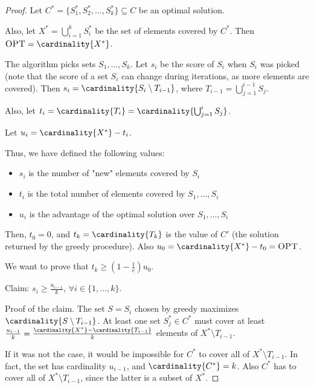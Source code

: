     \begin{proof}
        Let $C^* = \{ S_1^*, S_2^*, \dots, S_k^* \} \subseteq C$ be an optimal solution.

        Also, let $X^* = \bigcup_{i=1}^k S_i^*$ be the set of elements covered by $C^*$.
        Then $\textsc{OPT} = \cardinality{X^*}$.

        The algorithm picks sets $S_1, \dots, S_k$.
        Let $s_i$ be the score of $S_i$ when $S_i$ was picked (note that the score of a set $S_i$ can change during iterations, as more elements are covered).
        Then $s_i = \cardinality{S_i \setminus T_{i-1}}$, where $T_{i-1} = \bigcup_{j=1}^{i-1}S_j$.

        Also, let $t_i = \cardinality{T_i} = \cardinality{\bigcup_{j=1}^{i}S_j}$.

        Let $u_i = \cardinality{X^*} - t_i$.

        Thus, we have defined the following values:
        \begin{itemize}
            \item $s_i$ is the number of "new" elements covered by $S_i$
            \item $t_i$ is the total number of elements covered by $S_1, \dots, S_i$
            \item $u_i$ is the advantage of the optimal solution over $S_1, \dots, S_i$
        \end{itemize}

        Then, $t_0 = 0$, and $t_k = \cardinality{T_k}$ is the value of $C'$ (the solution returned by the greedy procedure).
        Also $u_0 = \cardinality{X^*} - t_0 = \textsc{OPT}$.

        We want to prove that $t_k \geq (1 - \frac{1}{e})u_0$.

        Claim: $s_i \geq \frac{u_{i-1}}{k}$, $\forall i \in \{ 1, \dots, k \}$.

        Proof of the claim.
        The set $S = S_i$ chosen by greedy maximizes $\cardinality{S \setminus T_{i-1}}$.
        At least one set $S_j^* \in C^*$ must cover at least $\frac{u_{i-1}}{k} = \frac{\cardinality{X^*} - \cardinality{T_{i-1}}}{k}$ elements of $X^* \setminus T_{i-1}$.

        If it was not the case, it would be impossible for $C^*$ to cover all of $X^* \setminus T_{i-1}$.
        In fact, the set has cardinality $u_{i-1}$, and $\cardinality{C^*} = k$. Also $C^*$ has to cover all of $X^* \setminus T_{i-1}$, since the latter is a subset of $X^*$.


\end{proof}
